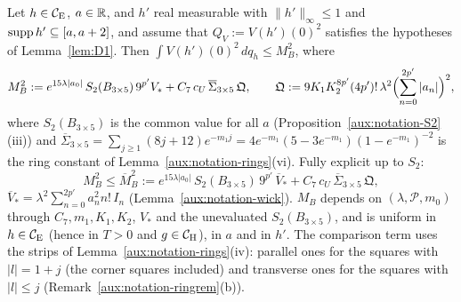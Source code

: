 \begin{auxprop}\label{aux:constants-D4}
Let $h\in\mathcal{C}_{\mathrm E}$, $a\in\mathbb{R}$, and $h'$ real measurable with $\|h'\|_\infty\le1$ and $\operatorname{supp}
h'\subseteq[a,a+2]$, and assume that $Q_V:=V(h')(0)^2$ satisfies the hypotheses of
Lemma~\ref{lem:D1}.  Then $\int V(h')(0)^2\,dq_h\le M_B^2$, where
\[
 M_B^2:=e^{15\lambda|a_0|}\,S_2(B_{3\times5})\,9^{p'}V_*
 +C_7\,c_U\,\overline\Sigma_{3\times5}\,\mathfrak Q,
 \qquad
 \mathfrak Q:=9K_1K_2^{8p'}(4p')!\,\lambda^2\Bigl(\sum_{n=0}^{2p'}|a_n|\Bigr)^2 ,
\]
where $S_2(B_{3\times5})$ is the common value for all $a$ (Proposition~\ref{aux:notation-S2}(iii))
and $\overline\Sigma_{3\times5}=\sum_{j\ge1}(8j+12)e^{-m_1j}=4e^{-m_1}(5-3e^{-m_1})
(1-e^{-m_1})^{-2}$ is the ring constant of Lemma~\ref{aux:notation-rings}(vi).  Fully explicit up
to $S_2$:
\[
 M_B^2\le\overline M_B^2:=e^{15\lambda|a_0|}\,S_2(B_{3\times5})\,9^{p'}\,\overline V_*
 +C_7\,c_U\,\overline\Sigma_{3\times5}\,\mathfrak Q ,
\]
$\overline V_*=\lambda^2\sum_{n=0}^{2p'}a_n^2n!\,I_n$ (Lemma~\ref{aux:notation-wick}).  $M_B$
depends on $(\lambda,\mathscr P,m_0)$ through $C_7,m_1,K_1,K_2$, $V_*$ and the unevaluated
$S_2(B_{3\times5})$, and is uniform in $h\in\mathcal{C}_{\mathrm E}$ (hence in $T>0$ and $g\in\mathcal{C}_{\mathrm H}$), in $a$ and in
$h'$.  The comparison term uses the strips of Lemma~\ref{aux:notation-rings}(iv): parallel ones
for the squares with $|l|=1+j$ (the corner squares included) and transverse ones for the squares
with $|l|\le j$ (Remark~\ref{aux:notation-ringrem}(b)).
\end{auxprop}

